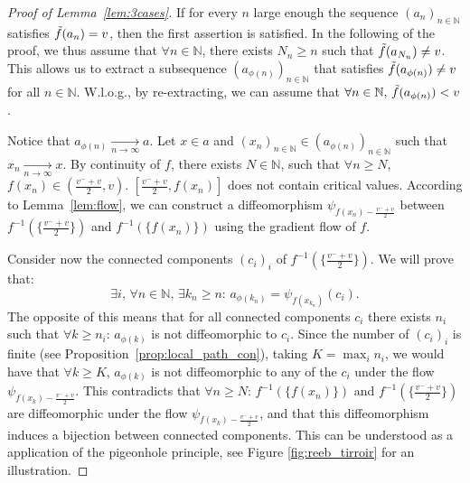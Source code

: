 \documentclass[pdflatex,sn-mathphys-ay]{sn-jnl}%
\newcommand{\converge}{\underset{n\rightarrow\infty}{\longrightarrow}}
\newcommand{\N}{\mathbb{N}}
\newcommand{\preim}[2]{#1^{-1}(#2)}
\newcommand{\change}[1]{\noindent #1}
\theoremstyle{thmstyleone}%
\begin{document}
\begin{appendices}
\begin{proof}[Proof of Lemma~\ref{lem:3cases}]
If for every $n$ large enough the sequence $(a_n)_{n\in\N}$ satisfies $\Tilde{f}(a_n)=v$, then the first assertion is satisfied. In the following of the proof, we thus assume that $\forall n\in\N$, there exists $N_n\geq n$ such that $\Tilde{f}(a_{N_n})\neq v$. This allows us to extract a subsequence $(a_{\phi(n)})_{n\in\N}$ that satisfies $\Tilde{f}(a_{\phi(n)})\neq v$ for all $n\in\N$. W.l.o.g., by re-extracting, we can assume that $\forall n\in \N,\,\Tilde{f}(a_{\phi(n)})< v$.


Notice that $a_{\phi(n)}\converge a$. Let $x\in a$ and $(x_n)_{n\in\N}\in(a_{\phi(n)})_{n\in\N}$ such that $x_n\converge x$. 
By continuity of $f$, there exists $N\in\N$, such that $\forall n\geq N$, $f(x_n)\in(\frac{v^-+v}{2},v)$.
$[\frac{v^-+v}{2},f(x_n)]$ does not contain critical values. \change{According to Lemma~\ref{lem:flow}, we can construct a diffeomorphism $\psi_{f(x_n)-\frac{v^-+v}{2}}$ between $\preim{f}{\{\frac{v^-+v}{2}\}}$ and $\preim{f}{\{f(x_n)\}}$ using the gradient flow of $f$.} 

Consider now the connected components $(c_i)_i$ of $\preim{f}{\{\frac{v^-+v}{2}\}}$. We will prove that: $$ \exists i,\,\forall n\in\N,\,\exists k_n\geq n:\,a_{\phi(k_n)}=\psi_{f(x_{k_n})}(c_i) .$$
The opposite of this means that for all connected components $c_i$ there exists $n_i$ such that $\forall k\geq n_i$: $a_{\phi(k)}$ is not diffeomorphic to $c_i$. Since the number of $(c_i)_i$ is finite (see Proposition~\ref{prop:local_path_con}), taking $K=\max_i n_i$, we would have that $\forall k\geq K$, $a_{\phi(k)}$ is not diffeomorphic to any of the $c_i$ under the flow $\psi_{f(x_k)-\frac{v^-+v}{2}}$. This contradicts that $\forall n\geq N$: $\preim{f}{\{f(x_n)\}}$ and $\preim{f}{\{\frac{v^-+v}{2}\}}$ are diffeomorphic under the flow $\psi_{f(x_k)-\frac{v^-+v}{2}}$, and that this diffeomorphism induces a bijection between connected components. This can be understood as a application of the pigeonhole principle, see Figure \ref{fig:reeb_tirroir} for an illustration. 


\end{proof}
\end{appendices}
\end{document}
